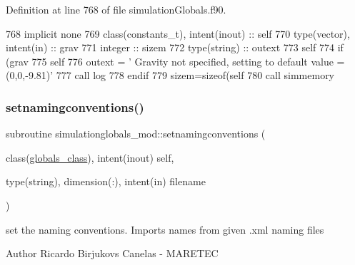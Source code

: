 Definition at line 768 of file simulation\+Globals.\+f90.


\begin{DoxyCode}
768     \textcolor{keywordtype}{implicit none}
769     \textcolor{keywordtype}{class}(constants\_t), \textcolor{keywordtype}{intent(inout)} :: self
770     \textcolor{keywordtype}{type}(vector), \textcolor{keywordtype}{intent(in)} :: grav
771     \textcolor{keywordtype}{integer} :: sizem
772     \textcolor{keywordtype}{type}(string) :: outext
773     self%
774     \textcolor{keywordflow}{if} (grav%
775         self%
776         outext = \textcolor{stringliteral}{'       Gravity not specified, setting to default value = (0,0,-9.81)'}
777         \textcolor{keyword}{call }log%
778 \textcolor{keywordflow}{    endif}
779     sizem=sizeof(self%
780     \textcolor{keyword}{call }simmemory%
\end{DoxyCode}
\mbox{\label{namespacesimulationglobals__mod_affd52c4c7b1c3f7ce282eeb7e4b4a359}} 
\subsubsection{\texorpdfstring{setnamingconventions()}{setnamingconventions()}}
{\footnotesize\ttfamily subroutine simulationglobals\+\_\+mod\+::setnamingconventions (\begin{DoxyParamCaption}\item[{class(\mbox{\hyperlink{structsimulationglobals__mod_1_1globals__class}{globals\+\_\+class}}), intent(inout)}]{self,  }\item[{type(string), dimension(\+:), intent(in)}]{filename }\end{DoxyParamCaption})\hspace{0.3cm}{\ttfamily [private]}}



set the naming conventions. Imports names from given .xml naming files 

\begin{DoxyAuthor}{Author}
Ricardo Birjukovs Canelas -\/ M\+A\+R\+E\+T\+EC 
\end{DoxyAuthor}


